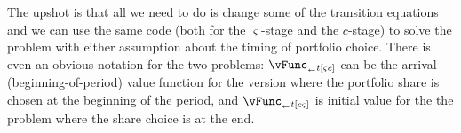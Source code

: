 \documentclass[titlepage, headings=optiontotocandhead]{Resources/texmf-local/tex/latex/econtex}
\begin{document}
The upshot is that all we need to do is change some of the transition equations and we can use the same code (both for the $\varsigma$-stage and the ${c}$-stage) to solve the problem with either assumption about the timing of portfolio choice.  There is even an obvious notation for the two problems: $\vFunc_{_\leftarrow t[\varsigma{c}]}$ can be the arrival (beginning-of-period) value function for the version where the portfolio share is chosen at the beginning of the period, and $\vFunc_{_\leftarrow t[{c}\varsigma]}$ is initial value for the the problem where the share choice is at the end.





\end{document}
